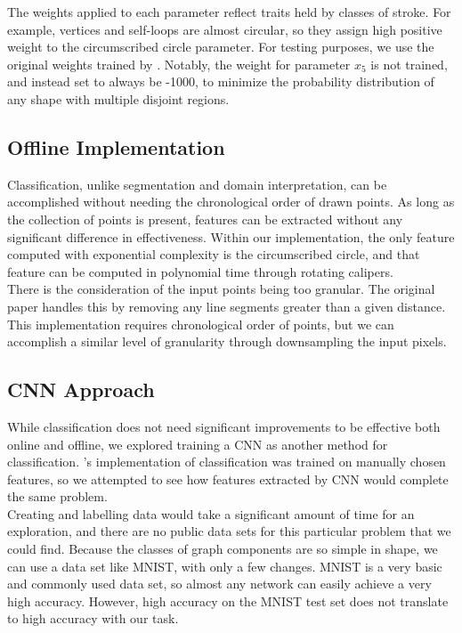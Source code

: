 The weights applied to each parameter reflect traits held by classes of stroke. For example, vertices and self-loops are almost circular, so they assign high positive weight to the circumscribed circle parameter. For testing purposes, we use the original weights trained by \citeauthor{daly2015hand} \cite{daly2015hand}. Notably, the weight for parameter $x_5$ is not trained, and instead set to always be -1000, to minimize the probability distribution of any shape with multiple disjoint regions.

\subsection{Offline Implementation}

Classification, unlike segmentation and domain interpretation, can be accomplished without needing the chronological order of drawn points. As long as the collection of points is present, features can be extracted without any significant difference in effectiveness. Within our implementation, the only feature computed with exponential complexity is the circumscribed circle, and that feature can be computed in polynomial time through rotating calipers. \\

There is the consideration of the input points being too granular. The original paper handles this by removing any line segments greater than a given distance. This implementation requires chronological order of points, but we can accomplish a similar level of granularity through downsampling the input pixels.

\subsection{CNN Approach}
While classification does not need significant improvements to be effective both online and offline, we explored training a CNN as another method for classification. \citeauthor{daly2015hand}'s implementation of classification was trained on manually chosen features, so we attempted to see how features extracted by CNN would complete the same problem.\\

Creating and labelling data would take a significant amount of time for an exploration, and there are no public data sets for this particular problem that we could find. Because the classes of graph components are so simple in shape, we can use a data set like MNIST, with only a few changes. MNIST is a very basic and commonly used data set, so almost any network can easily achieve a very high accuracy. However, high accuracy on the MNIST test set does not translate to high accuracy with our task. \\


